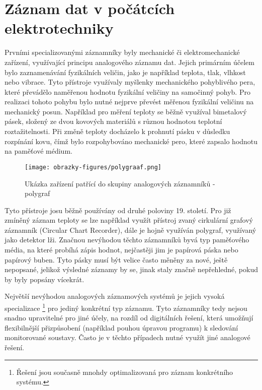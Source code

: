 \section{Záznam dat v počátcích elektrotechniky}
\label{zaznam}
Prvními specializovanými záznamníky byly mechanické či elektromechanické zařízení, využívající principu analogového záznamu dat. Jejich primárním účelem bylo zaznamenávání fyzikálních veličin, 
jako je například teplota, tlak, vlhkost nebo vibrace. Tyto přístroje využívaly myšlenky mechanického pohyblivého pera, které převádělo naměřenou hodnotu fyzikální veličiny na samočinný pohyb. 
Pro realizaci tohoto pohybu bylo nutné nejprve převést měřenou fyzikální veličinu na mechanický posun. Například pro měření teploty se běžně využíval bimetalový pásek, složený ze dvou kovových 
materiálů s různou hodnotou teplotní roztažitelnosti. Při změně teploty docházelo k prohnutí pásku v důsledku rozpínání kovu, čímž bylo rozpohybováno mechanické pero, které zapsalo hodnotu na 
paměťové médium. 


\begin{figure}[h] %
    \centering
    \texttt{[image: obrazky-figures/polygraaf.png]}
    \caption{Ukázka zařízení patřící do skupiny analogových záznamníků - polygraf \cite{polygraph_picture}}
    \label{fig:polygraaf}
\end{figure}


Tyto přístroje josu běžně používány od druhé poloviny 19. století. Pro již zmíněný záznam teploty se lze například využít přístroj zvaný cirkulární grafový záznamník (Circular Chart Recorder), 
dále je hojně využíván polygraf, využívaný jako detektor lži. Značnou nevýhodou těchto záznamníků byvá typ paměťového média, na které probíhá zápis hodnot, nejčastěji jim je papírová páska 
nebo papírový buben. Tyto pásky musí být velice často měněny za nové, ještě nepopsané, jelikož výsledné záznamy by se, jinak staly značně nepřehledné, pokud by byly popsány 
vícekrát. \cite{origin_of_chart_recorders}

Největší nevýhodou analogových záznamových systémů je jejich vysoká specializace \footnote{Řešení jsou současně mnohdy optimalizovaná pro záznam konkrétního systému.} pro jediný konkrétní typ 
záznamu. Tyto záznamníky tedy nejsou snadno upravitelné pro jiné účely, na rozdíl od digitálních řešení, která umožňují flexibilnější přizpůsobení (například pouhou úpravou programu) k 
sledování monitorované soustavy. Často je v těchto případech nutné využít jiné analogové řešení. \cite{analog_signal_and_digital_signal_processing_Tel_System}

